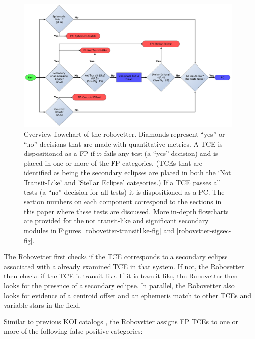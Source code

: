 \begin{figure}[htbp]
\centering
\includegraphics[width=0.9\linewidth]{RoboVetter-Diagram-V4-Overview.pdf}
\caption{Overview flowchart of the robovetter. Diamonds represent ``yes'' or ``no'' decisions that are made with quantitative metrics. A TCE is dispositioned as a FP if it fails any test (a ``yes'' decision) and is placed in one or more of the FP categories. (TCEs that are identified as being the secondary eclipses are placed in both the `Not Transit-Like' and 'Stellar Eclipse' categories.) If a TCE passes all tests (a ``no'' decision for all tests) it is dispositioned as a PC. The section numbers on each component correspond to the sections in this paper where these tests are discussed. More in-depth flowcharts are provided for the not transit-like and significant secondary modules in Figures~\ref{robovetter-transitlike-fig} and \ref{robovetter-sigsec-fig}.}
\label{robovetter-overview-fig}
\end{figure}


The Robovetter first checks if the TCE corresponds to a secondary eclipse associated with a already examined TCE in that system. If not, the Robovetter then checks if the TCE is transit-like. If it is transit-like, the Robovetter then looks for the presence of a secondary eclipse. In parallel, the Robovetter also looks for evidence of a centroid offset and an ephemeris match to other TCEs and variable stars in the \kepler{} field. 

\label{s:majorflags}
Similar to previous KOI catalogs \citep{Rowe2015cat, Mullally2015cat, Coughlin2016}, the Robovetter assigns FP TCEs to one or more of the following false positive categories:


